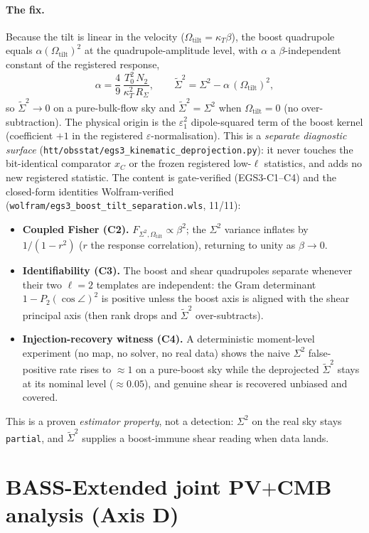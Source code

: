 \documentclass[11pt]{article}
\newcommand{\code}[1]{\texttt{\small #1}}
\newcommand{\Sig}{\Sigma^2}
\newcommand{\Sigt}{\widetilde{\Sigma}^2}
\newcommand{\Otilt}{\Omega_{\mathrm{tilt}}}
\begin{document}
\paragraph{The fix.} Because the tilt is linear in the velocity
($\Otilt=\kappa_T\beta$), the boost quadrupole equals $\alpha(\Otilt)^2$ at the
quadrupole-amplitude level, with $\alpha$ a $\beta$-independent constant of the
registered response,
\begin{equation}
  \alpha=\frac{4}{9}\,\frac{T_0^2\,N_2}{\kappa_T^2\,R_\Sigma},
  \qquad
  \Sigt=\Sig-\alpha\,(\Otilt)^2 ,
\end{equation}
so $\Sigt\to0$ on a pure-bulk-flow sky and $\Sigt=\Sig$ when $\Otilt=0$ (no
over-subtraction). The physical origin is the $\varepsilon_1^2$ dipole-squared
term of the boost kernel (coefficient $+1$ in the registered
$\varepsilon$-normalisation). This is a \emph{separate diagnostic surface}
(\code{htt/obsstat/egs3\_kinematic\_deprojection.py}): it never touches the
bit-identical comparator $x_C$ or the frozen registered low-$\ell$ statistics,
and adds no new registered statistic. The content is gate-verified (EGS3-C1--C4)
and the closed-form identities Wolfram-verified
(\code{wolfram/egs3\_boost\_tilt\_separation.wls}, 11/11):
\begin{itemize}
\item \textbf{Coupled Fisher (C2).} $F_{\Sig,\Otilt}\propto\beta^2$; the $\Sig$
variance inflates by $1/(1-r^2)$ ($r$ the response correlation), returning to
unity as $\beta\to0$.
\item \textbf{Identifiability (C3).} The boost and shear quadrupoles separate
whenever their two $\ell=2$ templates are independent: the Gram determinant
$1-P_2(\cos\angle)^2$ is positive unless the boost axis is aligned with the
shear principal axis (then rank drops and $\Sigt$ over-subtracts).
\item \textbf{Injection-recovery witness (C4).} A deterministic moment-level
experiment (no map, no solver, no real data) shows the naive $\Sig$
false-positive rate rises to $\approx 1$ on a pure-boost sky while the
deprojected $\Sigt$ stays at its nominal level ($\approx 0.05$), and genuine
shear is recovered unbiased and covered.
\end{itemize}
This is a proven \emph{estimator property}, not a detection: $\Sig$ on the real
sky stays \code{partial}, and $\Sigt$ supplies a boost-immune shear reading when
data lands.

\section{BASS-Extended joint PV$+$CMB analysis (Axis D)}\label{sec:axisd}
\end{document}
